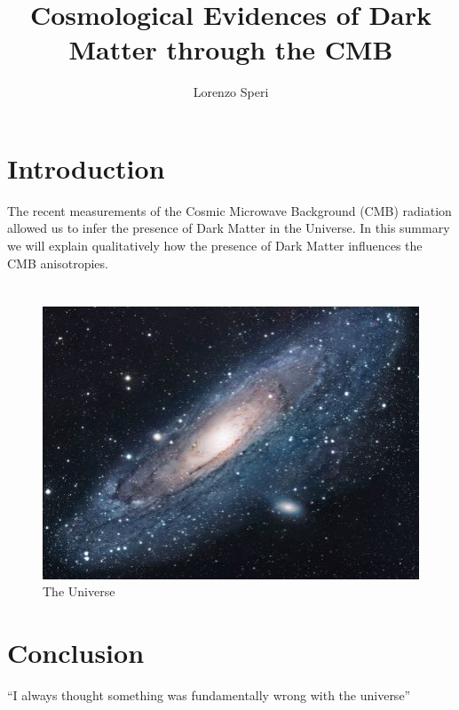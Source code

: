 \documentclass{article}
\title{Cosmological Evidences of Dark Matter through the CMB}
\author{Lorenzo Speri}
\date{}
\begin{document}
\maketitle


\section{Introduction}
The recent measurements of the Cosmic Microwave Background (CMB) radiation allowed us to infer the presence of Dark Matter in the Universe. In this summary we will explain qualitatively how the presence of Dark Matter influences the CMB anisotropies.

\section{}

\begin{figure}[h!]
\centering
\includegraphics[scale=1.7]{universe}
\caption{The Universe}
\label{fig:universe}
\end{figure}

\section{Conclusion}
``I always thought something was fundamentally wrong with the universe'' \citep{adams1995hitchhiker}



\end{document}
